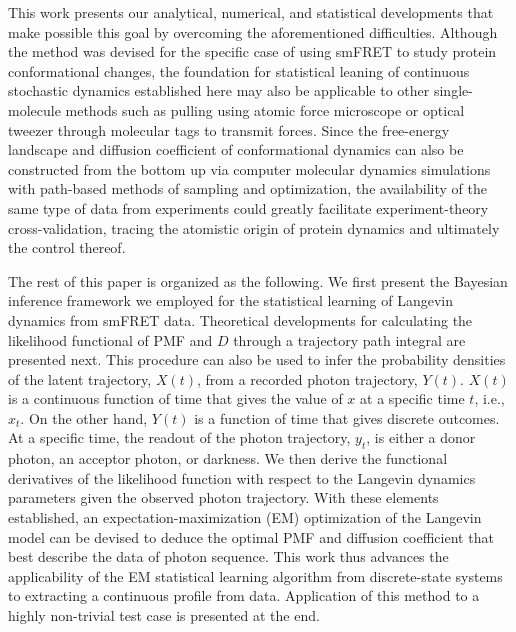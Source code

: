 \documentclass[journal=jpcbfk,manuscript=article,layout=twocolumn,articletitle=true]{achemso}
\begin{document}
This work presents our analytical, numerical, and statistical developments that make possible this goal by overcoming the aforementioned difficulties. Although the method was devised for the specific case of using smFRET to study protein conformational changes, the foundation for statistical leaning of continuous stochastic dynamics established here may also be applicable to other single-molecule methods such as pulling using atomic force microscope or optical tweezer through molecular tags to transmit forces. Since the free-energy landscape and diffusion coefficient of conformational dynamics can also be constructed from the bottom up via computer molecular dynamics simulations with path-based methods of sampling and optimization,\cite{Brokaw:2009tm,Haas:2009jk} the availability of the same type of data from experiments could greatly facilitate experiment-theory cross-validation, tracing the atomistic origin of protein dynamics and ultimately the control thereof.

The rest of this paper is organized as the following. We first present the Bayesian inference framework we employed for the statistical learning of Langevin dynamics from smFRET data. Theoretical developments for calculating the likelihood functional of PMF and $D$ through a trajectory path integral are presented next. This procedure can also be used to infer the probability densities of the latent trajectory, $X(t)$, from a recorded photon trajectory, $Y(t)$. $X(t)$ is a continuous function of time that gives the value of $x$ at a specific time $t$, i.e., $x_t$. On the other hand, $Y(t)$ is a function of time that gives discrete outcomes. At a specific time, the readout of the photon trajectory, $y_t$, is either a donor photon, an acceptor photon, or darkness. We then derive the functional derivatives of the likelihood function with respect to the Langevin dynamics parameters given the observed photon trajectory. With these elements established, an expectation-maximization (EM) optimization of the Langevin model can be devised to deduce the optimal PMF and diffusion coefficient that best describe the data of photon sequence. This work thus advances the applicability of the EM statistical learning algorithm from discrete-state systems to extracting a continuous profile from data. Application of this method to a highly non-trivial test case is presented at the end.
\end{document}
